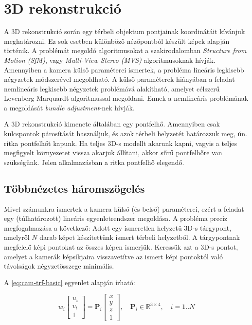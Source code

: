\chapter{3D rekonstrukció}

	A 3D rekonstrukció során egy térbeli objektum pontjainak koordinátáit kívánjuk meghatározni. Ez sok esetben különböző nézőpontból készült képek alapján történik. A problémát megoldó algoritmusokat a szakirodalomban \textit{Structure from Motion (SfM)}, vagy \textit{Multi-View Stereo (MVS)} algoritmusoknak hívják. Amennyiben a kamera külső paraméterei ismertek, a probléma lineáris legkisebb négyzetek módszerével megoldható. A külső paraméterek hiányában a feladat nemlineáris legkisebb négyzetek problémává alakítható, amelyet célszerű Levenberg-Marquardt algoritmussal megoldani. Ennek a nemlineáris problémának a megoldását \textit{bundle adjustment}-nek hívják.
	
	A 3D rekonstrukció kimenete általában egy pontfelhő. Amennyiben csak kulcspontok párosítását használjuk, és azok térbeli helyzetét határozzuk meg, ún. ritka pontfelhőt kapunk. Ha teljes 3D-s modellt akarunk kapni, vagyis a teljes megfigyelt környezetet vissza akarjuk állítani, akkor sűrű pontfelhőre van szükségünk. Jelen alkalmazásban a ritka pontfelhő elegendő.
	 
\section{Többnézetes háromszögelés}	 	
\label{muli-view-triang} 
	Mivel számunkra ismertek a kamera külső (és belső) paraméterei, ezért a feladat egy (túlhatározott) lineáris egyenletrendszer megoldása. A probléma precíz megfogalmazása a következő: Adott egy ismeretlen helyzetű 3D-s tárgypont, amelyről $N$ darab képet készítettünk ismert térbeli helyzetből. A tárgypontnak megfelelő képi pontokat az összes képen ismerjük. Keressük azt a 3D-s pontot, amelyet a kamerák képsíkjaira visszavetítve az ismert képi pontoktól való távolságok négyzetösszege minimális.
	
	A \eqref{eq:cam-trf-basic} egyenlet alapján írható:
	
	\begin{equation}
	\label{eq:mvs-trf-basic}
	w_i \left[ \begin{array}{c} u_i \\ v_i \\ 1 \end{array} \right] = \mathbf{P}_i \left[ \begin{array}{c} x \\ y \\ z \\ 1 \end{array} \right] , \quad \mathbf{P}_i \in \mathbb{R}^{3 \times 4}, \quad i = 1..N
	\end{equation}
	
